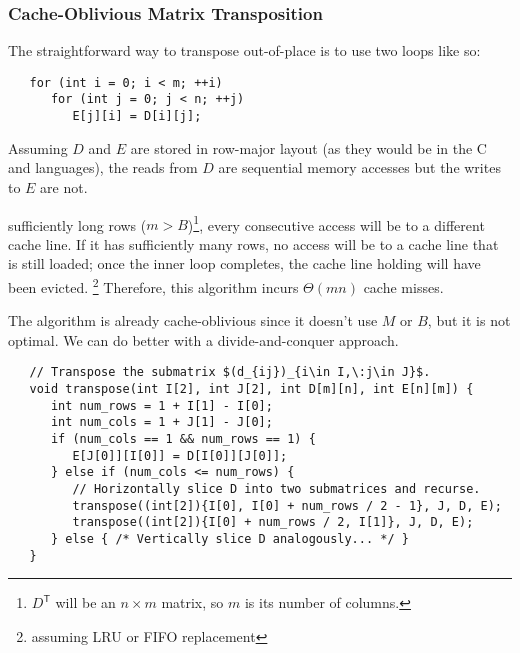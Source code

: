 \subsubsection{Cache-Oblivious Matrix Transposition}

The straightforward way to transpose 
out-of-place is to use two loops like so:
\begin{verbatim}
   for (int i = 0; i < m; ++i)
      for (int j = 0; j < n; ++j)
         E[j][i] = D[i][j];
\end{verbatim}
Assuming \(D\) and \(E\) are stored in row-major layout (as they would be in the C and
\cpp{} languages), the reads from \(D\) are sequential memory accesses but the writes to
\(E\) are not.

 sufficiently long rows (\(m > B\))\footnote{%
   \(D^\mathsf{T}\) will be an \(n\times m\) matrix, so \(m\) is its number of columns.
},
every consecutive access will be to a different cache line.  If it has sufficiently many
rows, no access will be to a cache line that is still loaded; once the inner loop
completes, the cache line holding  will have
been evicted.%
\footnote{%
   assuming LRU or FIFO replacement %
}
Therefore, this algorithm incurs \(\Theta(mn)\) cache misses.

The algorithm is  already cache-oblivious since it
doesn't use \(M\) or \(B\), but it is not optimal.  We can do better
with a divide-and-conquer approach.
\begin{verbatim}
   // Transpose the submatrix $(d_{ij})_{i\in I,\:j\in J}$.
   void transpose(int I[2], int J[2], int D[m][n], int E[n][m]) {
      int num_rows = 1 + I[1] - I[0];
      int num_cols = 1 + J[1] - J[0];
      if (num_cols == 1 && num_rows == 1) {
         E[J[0]][I[0]] = D[I[0]][J[0]];
      } else if (num_cols <= num_rows) {
         // Horizontally slice D into two submatrices and recurse.
         transpose((int[2]){I[0], I[0] + num_rows / 2 - 1}, J, D, E);
         transpose((int[2]){I[0] + num_rows / 2, I[1]}, J, D, E);
      } else { /* Vertically slice D analogously... */ }
   }
\end{verbatim}


